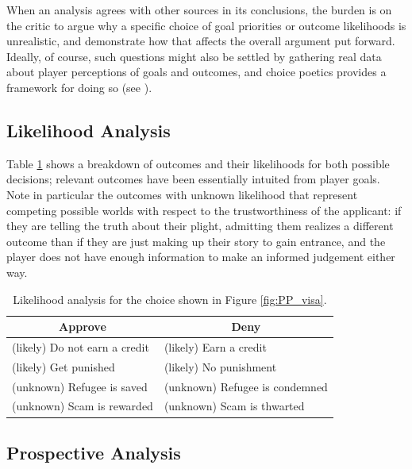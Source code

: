 \documentclass[arts,article,accept,moreauthors,pdftex,10pt,a4paper]{Definitions/mdpi}
\begin{document}
When an analysis agrees with other sources in its conclusions, the burden is on the critic to argue why a specific choice of goal priorities or outcome likelihoods is unrealistic, and demonstrate how that affects the overall argument put forward.
%
Ideally, of course, such questions might also be settled by gathering real data about player perceptions of goals and outcomes, and choice poetics provides a framework for doing so (see \cite{mawhorter2015intentionally}).



\subsection{Likelihood Analysis}

Table \ref{tab:PP_likelihoods} shows a breakdown of outcomes and their likelihoods for both possible decisions; relevant outcomes have been essentially intuited from player goals.
%
Note in particular the outcomes with unknown likelihood that represent competing possible worlds with respect to the trustworthiness of the applicant: if they are telling the truth about their plight, admitting them realizes a different outcome than if they are just making up their story to gain entrance, and the player does not have enough information to make an informed judgement either way.

\begin{table}[b]
\centering
\begin{tabular}{l l}
  \toprule
  \multicolumn{1}{c}{\textbf{Approve}} & \multicolumn{1}{c}{\textbf{Deny}} \\
  \midrule
  (likely) Do not earn a credit & (likely) Earn a credit \\
  (likely) Get punished & (likely) No punishment \\
  (unknown) Refugee is saved & (unknown) Refugee is condemned \\
  (unknown) Scam is rewarded & (unknown) Scam is thwarted \\
  \bottomrule
\end{tabular}
\caption[\emph{Papers, Please} likelihood analysis]{Likelihood analysis for the choice shown in Figure \ref{fig:PP_visa}.}
\label{tab:PP_likelihoods}
\end{table}


\subsection{Prospective Analysis}
\end{document}
